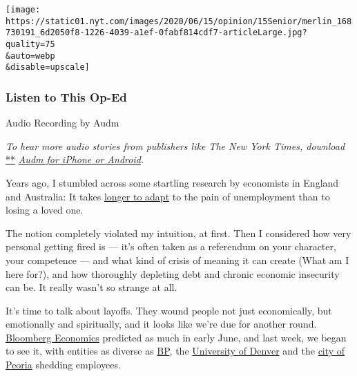 \texttt{[image: https://static01.nyt.com/images/2020/06/15/opinion/15Senior/merlin\_168730191\_6d2050f8-1226-4039-a1ef-0fabf814cdf7-articleLarge.jpg?quality=75\\\&auto=webp\\\&disable=upscale]}

\hypertarget{listen-to-this-op-ed}{%
\subsubsection{Listen to This Op-Ed}\label{listen-to-this-op-ed}}

Audio Recording by Audm

\emph{To hear more audio stories from publishers like The New York
Times, download}
\href{https://www.audm.com/?utm_source=nytmag\&utm_medium=embed\&utm_campaign=left_behind_draper}{**}
\href{https://www.audm.com/?utm_source=nytopinion\&utm_medium=embed\&utm_campaign=more_fired_pandemic}{\emph{Audm
for iPhone or Android}}\emph{.}

Years ago, I stumbled across some startling research by economists in
England and Australia: It takes
\href{https://books.google.com/books?id=E1Ic-dZtrBIC\&pg=PT101\&lpg=PT101\&dq=andrew+oswald+unemployment+death+of+a+spouse\&source=bl\&ots=gfUL7Y4GvI\&sig=ACfU3U2KXUi5OPsW78e0CwyFsEdFNB6aZg\&hl=en\&sa=X\&ved=2ahUKEwie2qna_P7pAhWuTTABHfoIBmwQ6AEwBnoECAgQAQ\#v=onepage\&q=andrew\%20oswald\%20unemployment\%20death\%20of\%20a\%20spouse\&f=false}{longer
to adapt} to the pain of unemployment than to losing a loved one.

The notion completely violated my intuition, at first. Then I considered
how very personal getting fired is --- it's often taken as a referendum
on your character, your competence --- and what kind of crisis of
meaning it can create (What am I here for?), and how thoroughly
depleting debt and chronic economic insecurity can be. It really wasn't
so strange at all.

It's time to talk about layoffs. They wound people not just
economically, but emotionally and spiritually, and it looks like we're
due for another round.
\href{https://www.bloomberg.com/graphics/2020-how-many-more-jobs-will-be-lost/}{Bloomberg
Economics} predicted as much in early June, and last week, we began to
see it, with entities as diverse as
\href{https://www.reuters.com/article/us-bp-jobs-exclusive/exclusive-bp-to-cut-15-of-workforce-sources-idUSKBN23F1D9}{BP},
the
\href{https://www.denverpost.com/2020/06/09/university-denver-layoffs-salary-cuts-covid/}{University
of Denver} and the
\href{https://week.com/2020/06/09/peoria-city-council-makes-first-round-of-job-cuts/}{city
of Peoria} shedding employees.


